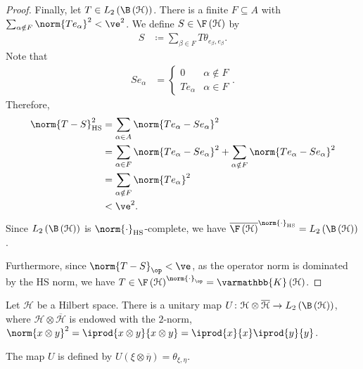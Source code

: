 \documentclass[10pt]{mypackage}
\renewcommand*{\mathbb}[1]{\varmathbb{#1}}
\DeclareMathOperator{\hs}{HS}
\begin{document}
\begin{proof}
  Finally, let $T\in L_2\left( \B\left( \mathcal{H} \right) \right)$. There is a finite $F\subseteq A$ with $\sum_{\alpha\notin F}\norm{Te_{\alpha}}^2 < \ve^2$. We define $S\in \F\left( \mathcal{H} \right)$ by
  \begin{align*}
    S &\coloneq \sum_{\beta\in F}T\theta_{e_{\beta},e_{\beta}}.
  \end{align*}
  Note that
  \begin{align*}
    Se_{\alpha} &= \begin{cases}
      0 & \alpha\notin F\\
      Te_{\alpha} & \alpha \in F
    \end{cases}.
  \end{align*}
  Therefore,
  \begin{align*}
    \norm{T - S}_{\hs}^2 &= \sum_{\alpha\in A} \norm{Te_{\alpha}-Se_{\alpha}}^2\\
                         &= \sum_{\alpha \in F}\norm {Te_{\alpha}-Se_{\alpha}}^2 + \sum_{\alpha\notin F}\norm{Te_{\alpha}-Se_{\alpha}}^2\\
                         &= \sum_{\alpha\notin F} \norm{Te_{\alpha}}^2\\
                         &< \ve^2.
  \end{align*}
  Since $L_2\left( \B\left( \mathcal{H} \right) \right)$ is $\norm{\cdot}_{\hs}$-complete, we have $\overline{\F\left( \mathcal{H} \right)}^{\norm{\cdot}_{\hs}} = L_2\left( \B\left( \mathcal{H} \right) \right) $.\newline

  Furthermore, since $\norm{T - S}_{\op} < \ve$, as the operator norm is dominated by the HS norm, we have $T\in \F\left( \mathcal{H} \right)^{\norm{\cdot}_{\op}} = \mathbb{K}\left( \mathcal{H} \right)$.
\end{proof}
\begin{proposition}
  Let $\mathcal{H}$ be a Hilbert space. There is a unitary map $U\colon \mathcal{H}\otimes \overline{\mathcal{H}} \rightarrow L_2\left( \B\left( \mathcal{H} \right) \right)$, where $\mathcal{H}\otimes \overline{\mathcal{H}}$ is endowed with the $2$-norm, $ \norm{x\otimes y}^2 = \iprod{x\otimes y}{x\otimes y} = \iprod{x}{x} \iprod{y}{y} $.\newline

  The map $U$ is defined by $U\left( \xi\otimes \overline{\eta} \right) = \theta_{\xi,\eta}$.
\end{proposition}
\end{document}
